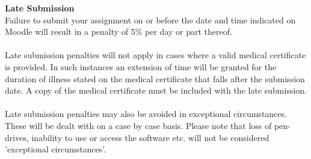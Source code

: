 \vspace{1cm}
\textbf{Late Submission}\\
Failure to submit your assignment on or before the date and time indicated on Moodle will result in a penalty of 5\% per day or part thereof.
\\
\\
Late submission penalties will not apply in cases where a valid medical certificate is provided.  In such instances an extension of time will be granted for the duration of illness stated on the medical certificate that falls after the submission date.  A copy of the medical certificate must be included with the late submission.
\\
\\
Late submission penalties may also be avoided in exceptional circumstances.  These will be dealt with on a case by case basis.  Please note that loss of pen-drives, inability to use or access the software etc. will not be considered 'exceptional circumstances'.